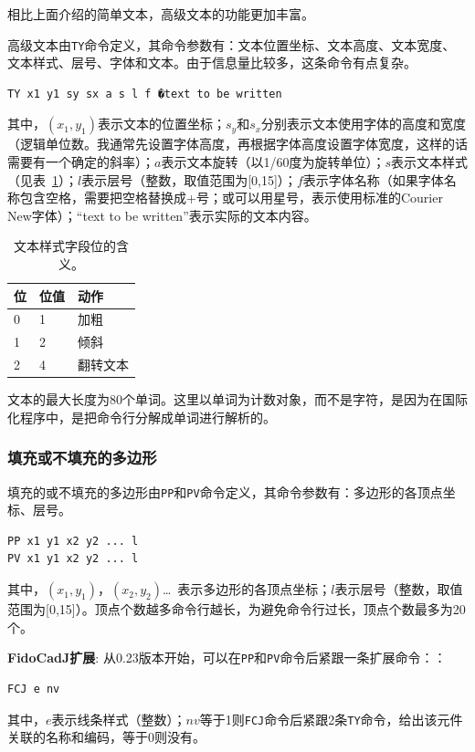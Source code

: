 \documentclass[10pt,a4paper,twoside]{scrreprt}
\newcommand{\toprule}{\hline}
\newcommand{\midrule}{\hline}
\newcommand{\bottomrule}{\hline}
\begin{document}
相比上面介绍的简单文本，高级文本的功能更加丰富。

高级文本由\lstinline!TY!命令定义，其命令参数有：文本位置坐标、文本高度、文本宽度、文本样式、层号、字体和文本。由于信息量比较多，这条命令有点复杂。
\begin{lstlisting}
TY x1 y1 sy sx a s l f �text to be written 
\end{lstlisting}
其中，$(x_{1},y_{1})$表示文本的位置坐标；$s_{y}$和$s_{x}$分别表示文本使用字体的高度和宽度（逻辑单位数。我通常先设置字体高度，再根据字体高度设置字体宽度，这样的话需要有一个确定的斜率）；$a$表示文本旋转（以1/60度为旋转单位）；$s$表示文本样式（见表~\ref{tab_stile_testo}）；$l$表示层号（整数，取值范围为[0,15]）；$f$表示字体名称（如果字体名称包含空格，需要把空格替换成+号\index{+}；或可以用星号，表示使用标准的Courier New字体）；“text to be written”表示实际的文本内容。

\begin{table}
\centering \begin{tabular}{llp{}}
\toprule 位  & 位值  & 动作 \tabularnewline
\midrule 0  &  1  &  加粗\tabularnewline
1  & 2  &  倾斜\tabularnewline
2  & 4  &  翻转文本\tabularnewline
\bottomrule %
\end{tabular}
\caption{文本样式字段位的含义。}
\label{tab_stile_testo} 
\end{table}

文本的最大长度为80个单词。这里以单词为计数对象，而不是字符，是因为在国际化程序中，是把命令行分解成单词进行解析的。

\subsubsection{填充或不填充的多边形}

填充的或不填充的多边形由\lstinline!PP!和\lstinline!PV!命令定义，其命令参数有：多边形的各顶点坐标、层号。
\begin{lstlisting}
PP x1 y1 x2 y2 ... l 
PV x1 y1 x2 y2 ... l 
\end{lstlisting} 
其中，$(x_{1},y_{1})$，$(x_{2},y_{2})$\dots\ 表示多边形的各顶点坐标；$l$表示层号（整数，取值范围为[0,15]）。顶点个数越多命令行越长，为避免命令行过长，顶点个数最多为20个。

\textbf{FidoCadJ扩展}: 从0.23版本开始，可以在\lstinline!PP!和\lstinline!PV!命令后紧跟一条扩展命令：：
\begin{lstlisting} 
FCJ e nv
\end{lstlisting}
其中，$e$表示线条样式（整数）；$nv$等于1则\lstinline!FCJ!命令后紧跟2条\lstinline!TY!命令，给出该元件关联的名称和编码，等于0则没有。
\end{document}
